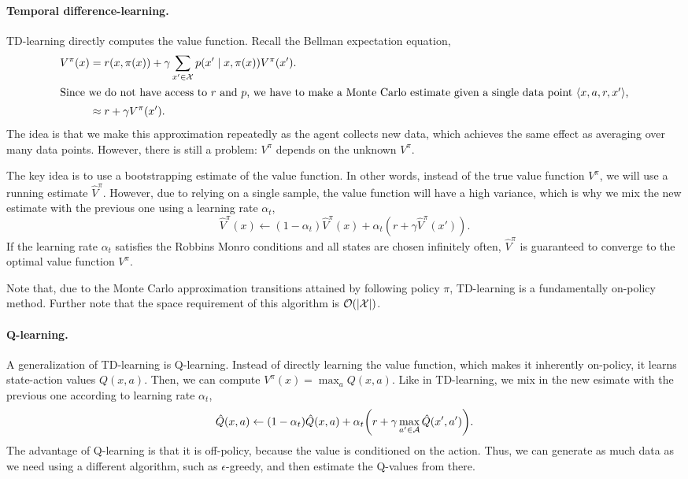 \paragraph{Temporal difference-learning.}

TD-learning directly computes the value function. Recall the Bellman
expectation equation, 
\begin{align*}
  V^\pi(x) &= r(x,\pi(x)) + \gamma \sum_{x'\in\mathcal{X}} p(x'\mid x,\pi(x)) V^\pi(x'). \\
  \intertext{Since we do not have access to $r$ and $p$, we have to make a
  Monte Carlo estimate given a single data point $\langle x,a,r,x' \rangle$,}
  &\approx r + \gamma V^\pi(x')
.\end{align*}
The idea is that we make this approximation repeatedly as the agent collects
new data, which achieves the same effect as averaging over many data points.
However, there is still a problem: $V^\pi$ depends on the unknown $V^\pi$.

The key idea is to use a bootstrapping estimate of the value function. In other
words, instead of the true value function $V^\pi$, we will use a running
estimate $\hat{V}^\pi$. However, due to relying on a single sample, the value
function will have a high variance, which is why we mix the new estimate with
the previous one using a learning rate $\alpha_t$, \[
  \hat{V}^\pi(x) \gets (1-\alpha_t) \hat{V}^\pi(x) + \alpha_t(r + \gamma \hat{V}^\pi(x'))
.\]
If the learning rate $\alpha_t$ satisfies the Robbins Monro conditions and all
states are chosen infinitely often, $\hat{V}^\pi$ is guaranteed to converge to
the optimal value function $V^\pi$.

Note that, due to the Monte Carlo approximation \wrt transitions attained by
following policy $\pi$, TD-learning is a fundamentally on-policy method.
Further note that the space requirement of this algorithm is $\bigo{|\X|}$.

\paragraph{Q-learning.}

A generalization of TD-learning is Q-learning. Instead of directly learning the
value function, which makes it inherently on-policy, it learns state-action
values $Q(x,a)$. Then, we can compute $V^\pi(x) = \max_{a} Q(x,a)$. Like in
TD-learning, we mix in the new esimate with the previous one according to
learning rate $\alpha_t$, \[
  \hat{Q}(x,a) \gets (1-\alpha_t) \hat{Q}(x,a) + \alpha_t \lft( r + \gamma \max_{a'\in\mathcal{A}} \hat{Q}(x',a') \rgt)
.\]
The advantage of Q-learning is that it is off-policy, because the value is
conditioned on the action. Thus, we can generate as much data as we need using a
different algorithm, such as $\epsilon$-greedy, and then estimate the Q-values
from there.

